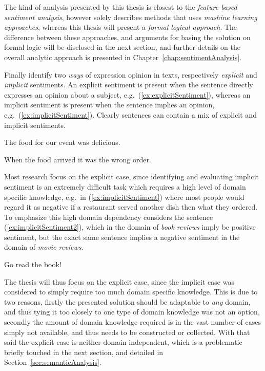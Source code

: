
The kind of analysis presented by this thesis is closest to the \emph{feature-based sentiment analysis}, however \citeauthor{webDataMining}  solely describes methods that uses \emph{mashine learning approaches}, whereas this thesis will present a \emph{formal logical approach}. The difference between these approaches, and arguments for basing the solution on formal logic will be disclosed in the next section, and further details on the overall analytic approach is presented in Chapter~\ref{chap:sentimentAnalysis}.

Finally \citeauthor{webDataMining}  identify two \emph{ways} of expression opinion in texts, respectively \emph{explicit} and \emph{implicit} sentiments. An explicit sentiment is present when the sentence directly expresses an opinion about a subject, e.g.\ (\ref{ex:explicitSentiment}), whereas an implicit sentiment is present when the sentence implies an opinion, e.g.\ (\ref{ex:implicitSentiment}). Clearly sentences can contain a mix of explicit and implicit sentiments.
\begin{numquote}
	 The food for our event was delicious.
	\label{ex:explicitSentiment}
\end{numquote}
\begin{numquote}
	 When the food arrived it was the wrong order.
	\label{ex:implicitSentiment}
\end{numquote}

Most research focus on the explicit case, since identifying and evaluating implicit sentiment is an extremely difficult task which requires a high level of domain specific knowledge, e.g.\ in (\ref{ex:implicitSentiment}) where most people would regard it as negative if a restaurant served another dish then what they ordered. To emphasize this high domain dependency \citeauthor{omsa}  considers the sentence (\ref{ex:implicitSentiment2}), which in the domain of \emph{book reviews} imply be positive sentiment, but the exact same sentence implies a negative sentiment in the domain of \emph{movie reviews}.
\begin{numquote}
	 Go read the book!
	\label{ex:implicitSentiment2}
\end{numquote}

The thesis will thus focus on the explicit case, since the implicit case was considered to simply require too much domain specific knowledge. This is due to two reasons, firstly the presented solution should be adaptable to \emph{any} domain, and thus tying it too closely to one type of domain knowledge was not an option, secondly the amount of domain knowledge required is in the vast number of cases simply not available, and thus needs to be constructed or collected. With that said the explicit case is neither domain independent, which is a problematic briefly touched in the next section, and detailed in Section~\ref{sec:semanticAnalysis}.

